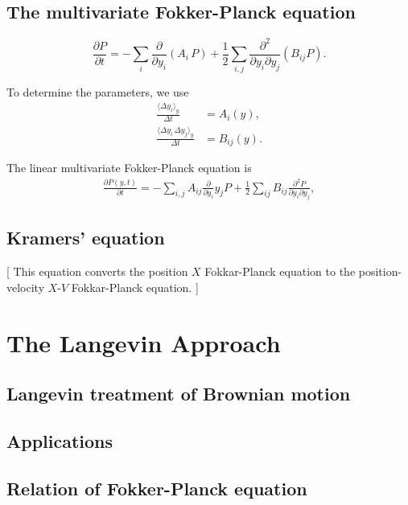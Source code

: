 \documentclass{book}
\theoremstyle{plain}
\theoremstyle{definition}
\theoremstyle{remark}
\begin{document}
\section{The multivariate Fokker-Planck equation}

\begin{equation}
\frac{ \partial P } { \partial t }
=
-\sum_i \frac{ \partial } { \partial y_i } (A_i \, P)
+ \frac 1 2
\sum_{i, j} \frac{ \partial^2 } { \partial y_i \partial y_j } (B_{ij} P ).
\tag{6.1}
\end{equation}

To determine the parameters, we use
\begin{equation}
\begin{aligned}
\frac{ \langle \Delta y_i \rangle_y } { \Delta t }
&=
A_i(y), \\
\frac{ \langle \Delta y_i \, \Delta y_j \rangle_y } { \Delta t }
&=
B_{ij}(y).
\end{aligned}
\tag{6.3}
\end{equation}

The linear multivariate Fokker-Planck equation is
\begin{align}
\frac{  \partial P(y, t) } { \partial t }
=
-\sum_{i,j} A_{ij} \frac{ \partial } { \partial y_i } y_j P
+ \frac 1 2 \sum_{ij} B_{ij} \frac{ \partial^2 P } { \partial y_i \partial y_j },
\tag{6.4}
\end{align}

\section{Kramers' equation}

[
  This equation converts the position $X$ Fokkar-Planck equation
  to the position-velocity $X$-$V$ Fokkar-Planck equation.
]

\chapter{The Langevin Approach}

\section{Langevin treatment of Brownian motion}

\section{Applications}

\section{Relation of Fokker-Planck equation}
\end{document}
